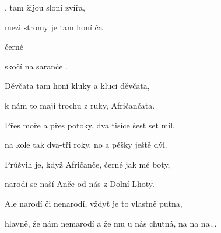 
\zs

, tam žijou sloni  
zvířa, 


mezi stromy je tam honí ča


    černé 


 skočí na saranče  .    

\ks
\zs

Děvčata tam honí kluky a kluci děvčata,

k nám to mají trochu z ruky, Afričančata.

Přes moře a přes potoky, dva tisíce šest set mil,

na kole tak dva-tři roky, no a pěšky ještě dýl.

\ks
\zs

Průšvih je, když Afričanče, černé jak mé boty,

narodí se naší Anče od nás z Dolní Lhoty.

Ale narodí či nenarodí, vždyť je to vlastně putna,

hlavně, že nám nemarodí a že mu u nás chutná, na na na...

\ks

\kp





